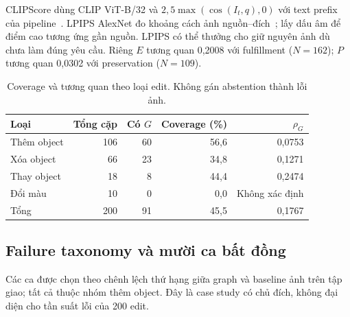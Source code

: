 CLIPScore dùng CLIP ViT-B/32 và $2,5\max(\cos(I_t,q),0)$ với text prefix
của pipeline~\cite{hessel2021clipscore}. LPIPS AlexNet đo khoảng cách ảnh
nguồn--đích~\cite{zhang2018lpips}; lấy dấu âm để điểm cao tương ứng gần nguồn.
LPIPS có thể thưởng cho giữ nguyên ảnh dù chưa làm đúng yêu cầu.
Riêng $E$ tương quan 0,2008 với fulfillment ($N=162$);
$P$ tương quan 0,0302 với preservation ($N=109$).

\begin{table}[H]\centering\small
\caption{Coverage và tương quan theo loại edit. Không gán abstention thành lỗi ảnh.}\label{tab:coverage}
\begin{tabular}{@{}lrrrr@{}}\toprule
Loại & Tổng cặp & Có $G$ & Coverage (\%) & $\rho_G$\\\midrule
Thêm object & 106 & 60 & 56,6 & 0,0753\\
Xóa object & 66 & 23 & 34,8 & 0,1271\\
Thay object & 18 & 8 & 44,4 & 0,2474\\
Đổi màu & 10 & 0 & 0,0 & Không xác định\\\midrule
Tổng & 200 & 91 & 45,5 & 0,1767\\
\bottomrule\end{tabular}\end{table}

\clearpage
\subsection{Failure taxonomy và mười ca bất đồng}
Các ca được chọn theo chênh lệch thứ hạng giữa graph và baseline ảnh trên tập
giao; tất cả thuộc nhóm thêm object. Đây là case study có chủ đích,
không đại diện cho tần suất lỗi của 200 edit.

